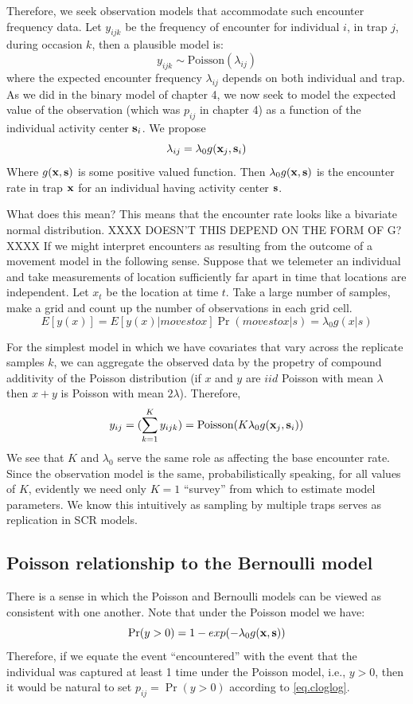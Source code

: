Therefore, we seek observation models that accommodate such encounter
frequency data.  Let $y_{ijk}$ be the frequency of encounter for
individual $i$, in trap $j$, during occasion $k$, then a plausible
model is:
\[
 y_{ijk} \sim \mbox{Poisson}(\lambda_{ij})
\]
where the expected encounter frequency $\lambda_{ij}$ depends on both
individual and trap. As we did in the binary model of chapter 4, we
now seek to model the expected value of the observation (which was
$p_{ij}$ in chapter 4) as a function of the individual activity center
${\bf s}_{i}$.
We propose 
\[
 \lambda_{ij} = \lambda_{0}  g({\bf x}_{j},{\bf s}_{i})
\]
Where $g({\bf x},{\bf s})$ is some positive valued function. 
Then $\lambda_{0}g({\bf x},{\bf s})$ is the encounter rate in trap
${\bf x}$ for an individual having activity center ${\bf s}$.  

What does this mean? This means that the encounter rate looks like a
bivariate normal distribution.  
XXXX DOESN'T THIS DEPEND ON THE FORM OF G? XXXX
If we might interpret encounters as
resulting from the outcome of a movement model in the following
sense. Suppose that we telemeter an individual and take measurements
of location sufficiently far apart in time that locations are
independent. Let $x_{t}$ be the location at time $t$. Take a large
number of samples, make a grid and count up the number of observations
in each grid cell.
\[
 E[y(x)] = E[y(x)| moves to x]\Pr(moves to x|s) = \lambda_{0} g(x|s)
\]


For the simplest model in which we have covariates that vary across
the replicate samples $k$, we can aggregate the observed data by the
propetry of compound additivity of the Poisson distribution (if $x$ and
$y$ are $iid$ Poisson with mean $\lambda$ then $x+y$ is Poisson with
mean $2\lambda$). Therefore,
\[
y_{ij} = (\sum_{k=1}^{K} y_{ijk}) =  \mbox{Poisson}(K  \lambda_{0} 
g({\bf x}_{j},{\bf s}_{i}) )
\]
We see that $K$ and $\lambda_{0}$ serve the same role as affecting the
base encounter rate. Since the observation model is the same,
probabilistically speaking, for all values of $K$, evidently we need
only $K=1$ ``survey'' from which to estimate model parameters. We know
this intuitively as sampling by multiple traps serves as replication
in SCR models.


\subsection{Poisson relationship to the Bernoulli model}

There is a sense in which the Poisson and Bernoulli models can
be viewed as consistent with one another. Note that under the Poisson
model we have:
\begin{equation}
 \Pr(y>0) = 1-exp(-\lambda_{0} g({\bf x},{\bf s}))
\label{eq.cloglog}
\end{equation}
Therefore, 
if we equate the event ``encountered'' with the event that the
individual was captured at least 1 time under the Poisson model, i.e., $y>0$, then it would be
natural to set $p_{ij} = \Pr(y>0)$ according to \ref{eq.cloglog}. 


